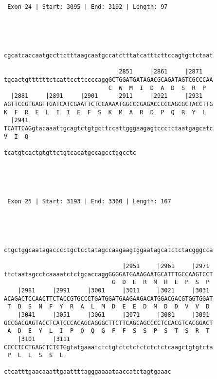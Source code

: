 \documentclass{article}
\begin{document}
\begin{Verbatim}
 Exon 24 | Start: 3095 | End: 3192 | Length: 97 




                                                            
cgcatcaccaatgccttctttaagcaatgccatctttatcatttcttccagtgttctaat
                                                            
                                |2851     |2861     |2871   
tgcactgttttttctcattccttccccaggGCTGGATGATAGACGCAGATAGTCGCCCAA
                              C  W  M  I  D  A  D  S  R  P  
  |2881     |2891     |2901     |2911     |2921     |2931   
AGTTCCGTGAGTTGATCATCGAATTCTCCAAAATGGCCCGAGACCCCCAGCGCTACCTTG
K  F  R  E  L  I  I  E  F  S  K  M  A  R  D  P  Q  R  Y  L  
  |2941                                                     
TCATTCAGgtacaaattgcagtctgtgcttccattgggaagagtccctctaatgagcatc
V  I  Q                                                     
                                      
tcatgtcactgtgttctgtcacatgccagcctggcctc
                                      




 Exon 25 | Start: 3193 | End: 3360 | Length: 167 




                                                            
ctgctggcaatagacccctgctcctatagccaagaagtggaatagcatctctacgggcca
                                                            
                                  |2951     |2961     |2971 
ttctaatagcctcaaaatctctgcaccaggGGGGATGAAAGAATGCATTTGCCAAGTCCT
                               G  D  E  R  M  H  L  P  S  P 
    |2981     |2991     |3001     |3011     |3021     |3031 
ACAGACTCCAACTTCTACCGTGCCCTGATGGATGAAGAAGACATGGACGACGTGGTGGAT
 T  D  S  N  F  Y  R  A  L  M  D  E  E  D  M  D  D  V  V  D 
    |3041     |3051     |3061     |3071     |3081     |3091 
GCCGACGAGTACCTCATCCCACAGCAGGGCTTCTTCAGCAGCCCCTCCACGTCACGGACT
 A  D  E  Y  L  I  P  Q  Q  G  F  F  S  S  P  S  T  S  R  T 
    |3101     |3111                                         
CCCCTCCTGAGCTCTCTGgtatgaaatctctgtctctctctctctctcaagctgtgtcta
 P  L  L  S  S  L                                           
                                                
ctcatttgaacaaattgaattttagggaaaataaccatctagtgaaac
                                                





\end{Verbatim}
\end{document}
